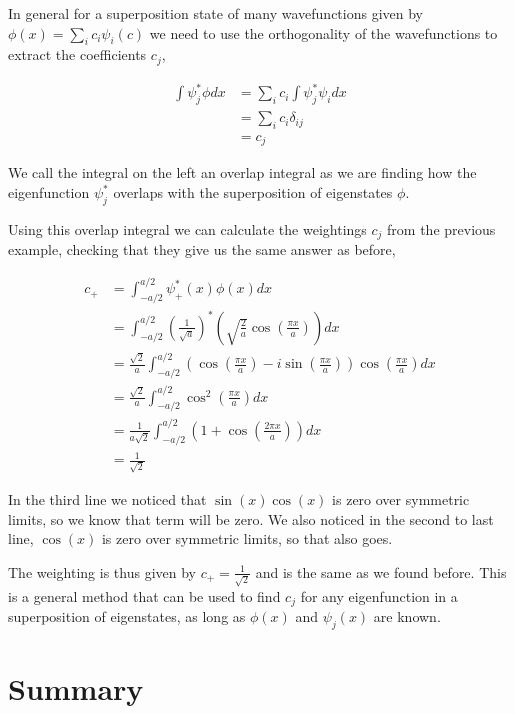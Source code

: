 \documentclass[11pt]{amsart}
\begin{document}
In general for a superposition state of many wavefunctions given by $\phi(x) = \sum\limits_i c_i \psi_i(c)$ we need to use the orthogonality of the wavefunctions to extract the coefficients $c_j$,

\begin{align*}
  \int\psi_j^*\phi dx &= \sum\limits_i c_i \int \psi_j^* \psi_i dx \\
                      &= \sum\limits_i c_i \delta_{ij} \\
                      &= c_j
\end{align*}

We call the integral on the left an overlap integral as we are finding how the eigenfunction $\psi_j^*$ overlaps with the superposition of eigenstates $\phi$.

Using this overlap integral we can calculate the weightings $c_j$ from the previous example, checking that they give us the same answer as before,

\begin{align*}
  c_+ &= \int_{-a/2}^{a/2} \psi^*_+(x) \phi(x) dx \\
      &= \int_{-a/2}^{a/2} {\left(\frac{1}{\sqrt{a}}\right)}^* \left(\sqrt{\frac{2}{a}} \cos{\left(\frac{\pi x}{a}\right)}\right) dx \\
      &= \frac{\sqrt{2}}{a} \int_{-a/2}^{a/2} \left(\cos{\left(\frac{\pi x}{a}\right)} - i\sin{\left(\frac{\pi x}{a}\right)}\right) \cos{\left(\frac{\pi x}{a}\right)} dx \\
      &= \frac{\sqrt{2}}{a} \int_{-a/2}^{a/2} \cos^2{\left(\frac{\pi x}{a}\right)} dx \\
      &= \frac{1}{a\sqrt{2}} \int_{-a/2}^{a/2} \left(1 + \cos{\left(\frac{2\pi x}{a}\right)}\right) dx \\
      &= \frac{1}{\sqrt{2}}
\end{align*}

In the third line we noticed that $\sin(x) \cos(x)$ is zero over symmetric limits, so we know that term will be zero. We also noticed in the second to last line, $\cos(x)$ is zero over symmetric limits, so that also goes.

The weighting is thus given by $c_+ = \frac{1}{\sqrt{2}}$ and is the same as we found before. This is a general method that can be used to find $c_j$ for any eigenfunction in a superposition of eigenstates, as long as $\phi(x)$ and $\psi_j(x)$ are known.

\section{Summary}
\end{document}

